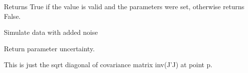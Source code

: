 \documentclass[letterpaper,10pt,english]{sphinxmanual}
\begin{document}
\begin{fulllineitems}
\begin{fulllineitems}
Returns True if the value is valid and the parameters were set,
otherwise returns False.

\end{fulllineitems}


\begin{fulllineitems}
\label{api/fitproblem:refl1d.fitproblem.MultiFitProblem.show}
\end{fulllineitems}


\begin{fulllineitems}
\label{api/fitproblem:refl1d.fitproblem.MultiFitProblem.simulate_data}
Simulate data with added noise

\end{fulllineitems}


\begin{fulllineitems}
\label{api/fitproblem:refl1d.fitproblem.MultiFitProblem.stderr}
Return parameter uncertainty.

This is just the sqrt diagonal of covariance matrix inv(J'J) at point p.

\end{fulllineitems}


\begin{fulllineitems}
\label{api/fitproblem:refl1d.fitproblem.MultiFitProblem.valid}
\end{fulllineitems}


\end{fulllineitems}

\end{document}
